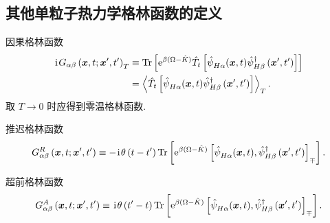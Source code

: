 \subsection{其他单粒子热力学格林函数的定义}
\begin{definition}{因果格林函数}{}
\begin{align}
\hspace{0.1em}\mathrm{i}\hspace{0.1em} G_{\alpha \beta}\left(\boldsymbol{x}, t ; \boldsymbol{x}^{\prime}, t^{\prime}\right)_T &\equiv \operatorname{Tr}\left[\mathrm{e}^{\beta(\Omega-\hat{K})} \hat{T}_t\left[\hat{\psi}^{}_{H \alpha}(\boldsymbol{x}, t) \hat{\psi}_{H \beta}^{\dagger}\left(\boldsymbol{x}^{\prime}, t^{\prime}\right)\right]\right]\nonumber\\
&=\left\langle \hat{T}_t\left[\hat{\psi}^{}_{H \alpha}(\boldsymbol{x}, t) \hat{\psi}_{H \beta}^{\dagger}\left(\boldsymbol{x}^{\prime}, t^{\prime}\right)\right]\right\rangle_T.
\end{align}
取 $T\to 0$ 时应得到零温格林函数.
\end{definition}

\begin{definition}{推迟格林函数}{}
\begin{equation}
 G_{\alpha \beta}^R\left(\boldsymbol{x}, t ; \boldsymbol{x}^{\prime}, t^{\prime}\right) \equiv - \hspace{0.1em}\mathrm{i}\hspace{0.1em}\theta\left(t-t^{\prime}\right) \operatorname{Tr}\left[\mathrm{e}^{\beta(\Omega-\hat{K})}\left[\hat{\psi}^{}_{H \alpha}(\boldsymbol{x}, t), \hat{\psi}_{H \beta}^{\dagger}\left(\boldsymbol{x}^{\prime}, t^{\prime}\right)\right]_{\mp}\right].
\end{equation}
\end{definition}

\begin{definition}{超前格林函数}{}
\begin{equation}
 G_{\alpha \beta}^A\left(\boldsymbol{x}, t ; \boldsymbol{x}^{\prime}, t^{\prime}\right) \equiv  \hspace{0.1em}\mathrm{i}\hspace{0.1em}\theta\left(t^{\prime}-t\right) \operatorname{Tr}\left[\mathrm{e}^{\beta(\Omega-\hat{K})}\left[\hat{\psi}^{}_{H \alpha}(\boldsymbol{x}, t), \hat{\psi}_{H \beta}^{\dagger}\left(\boldsymbol{x}^{\prime}, t^{\prime}\right)\right]_{\mp}\right].
\end{equation}
\end{definition}

